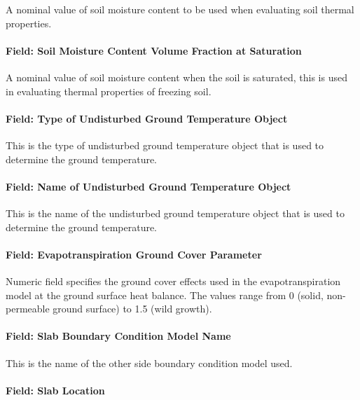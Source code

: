 A nominal value of soil moisture content to be used when evaluating soil thermal properties.

\paragraph{Field: Soil Moisture Content Volume Fraction at Saturation}\label{field-soil-moisture-content-volume-fraction-at-saturation-1}

A nominal value of soil moisture content when the soil is saturated, this is used in evaluating thermal properties of freezing soil.

\paragraph{Field: Type of Undisturbed Ground Temperature Object}\label{field-type-of-undisturbed-ground-temperature-object-000}

This is the type of undisturbed ground temperature object that is used to determine the ground temperature.

\paragraph{Field: Name of Undisturbed Ground Temperature Object}\label{field-name-of-undisturbed-ground-temperature-object-000}

This is the name of the undisturbed ground temperature object that is used to determine the ground temperature.

\paragraph{Field: Evapotranspiration Ground Cover Parameter}\label{field-evapotranspiration-ground-cover-parameter-1}

Numeric field specifies the ground cover effects used in the evapotranspiration model at the ground surface heat balance. The values range from 0 (solid, non-permeable ground surface) to 1.5 (wild growth).

\paragraph{Field: Slab Boundary Condition Model Name}\label{field-slab-boundary-condition-model-name}

This is the name of the other side boundary condition model used.

\paragraph{Field: Slab Location}\label{field-slab-location}

